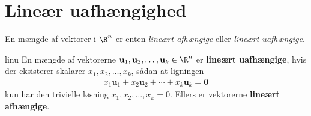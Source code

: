 \newpage
\noindent
\section{Lineær uafhængighed}
En mængde af vektorer i $\R^n$ er enten \textit{lineært afhængige} eller \textit{lineært uafhængige}.
%
%
% 
\begin{defn}{}{linu}
En mængde af vektorerne $\mathbf{u}_1, \mathbf{u}_2, \ldots , \mathbf{u}_k \in \R^n$ er \textbf{lineært uafhængige}, hvis der eksisterer skalarer $x_1, x_2, \ldots , x_k$, sådan at ligningen 
\begin{align*}
x_1\mathbf{u}_1 + x_2\mathbf{u}_2 + \cdots + x_k \mathbf{u}_k = \mathbf{0}
\end{align*}
kun har den trivielle løsning $x_1, x_2, \ldots, x_k = 0$.
Ellers er vektorerne \textbf{lineært afhængige}.
\end{defn}  
%
